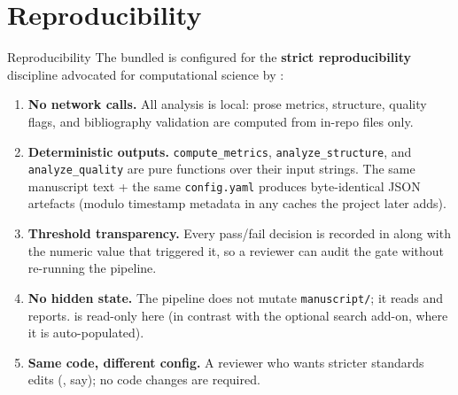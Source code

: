 \documentclass[
  ignorenonframetext,
]{beamer}
\author{\texorpdfstring{}{}}
\date{}
\providecommand{\tightlist}{%
  \setlength{\itemsep}{0pt}\setlength{\parskip}{0pt}}
\begin{document}
\section{Reproducibility}\label{sec:reproducibility}

\begin{frame}{Reproducibility}
The bundled  is configured for the
\textbf{strict reproducibility} discipline advocated for computational
science by :

\begin{enumerate}
\tightlist
\item
  \textbf{No network calls.} All analysis is local: prose metrics,
  structure, quality flags, and bibliography validation are computed
  from in-repo files only.
\item
  \textbf{Deterministic outputs.} \texttt{compute\_metrics},
  \texttt{analyze\_structure}, and \texttt{analyze\_quality} are pure
  functions over their input strings. The same manuscript text + the
  same \texttt{config.yaml} produces byte-identical JSON artefacts
  (modulo timestamp metadata in any caches the project later adds).
\item
  \textbf{Threshold transparency.} Every pass/fail decision is recorded
  in  along with the numeric value that
  triggered it, so a reviewer can audit the gate without re-running the
  pipeline.
\item
  \textbf{No hidden state.} The pipeline does not mutate
  \texttt{manuscript/}; it reads and reports.
   is read-only here (in contrast with
  the optional search add-on, where it is auto-populated).
\item
  \textbf{Same code, different config.} A reviewer who wants stricter
  standards edits 
  (, say); no code
  changes are required.
\end{enumerate}
\end{frame}
\end{document}
